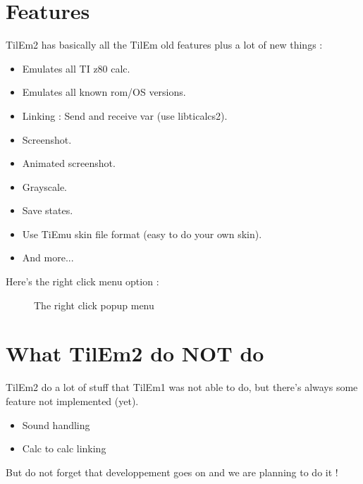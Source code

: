 \documentclass[10pt]{report}
\begin{document}
\section{Features}
TilEm2 has basically all the TilEm old features plus a lot of new things :\newline
\begin{itemize}
\item   Emulates all TI z80 calc.
\item	Emulates all known rom/OS versions.
\item	Linking : Send and receive var (use libticalcs2). 
\item	Screenshot.
\item	Animated screenshot. 
\item	Grayscale. 
\item	Save states.
\item	Use TiEmu skin file format (easy to do your own skin).
\item	And more...
\end{itemize}

Here's the right click menu option :\newline
\begin{figure}[H]
\centering
{}
\caption{The right click popup menu}
\end{figure}


\section{What TilEm2 do NOT do}
TilEm2 do a lot of stuff that TilEm1 was not able to do, but there's always some feature not implemented (yet).\newline
\begin{itemize}
\item Sound handling
\item Calc to calc linking
\end{itemize}
But do not forget that developpement goes on and we are planning to do it !\newline
\end{document}

